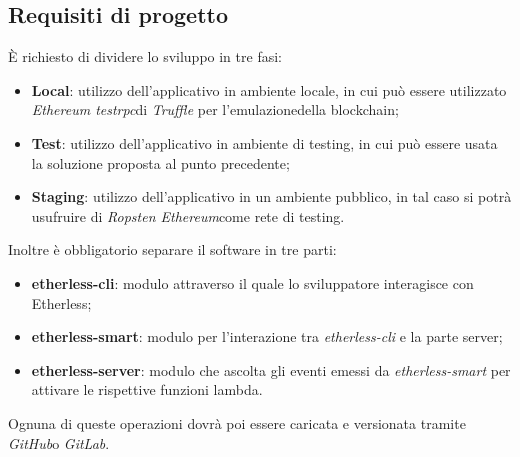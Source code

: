 \subsection{Requisiti di progetto}
È richiesto di dividere lo sviluppo in tre fasi:
\begin{itemize}
   	\item \textbf{Local}: utilizzo dell'applicativo in ambiente locale, in cui può essere utilizzato \textit{Ethereum testrpc}\glosp di \textit{Truffle} per
   	l'emulazione\glosp della blockchain\glo;
   	\item \textbf{Test}: utilizzo dell'applicativo in ambiente di testing, in cui può essere usata la soluzione proposta al punto precedente;
   	\item \textbf{Staging}: utilizzo dell'applicativo in un ambiente pubblico, in tal caso si potrà usufruire di \textit{Ropsten Ethereum}\glosp come rete di testing.
\end{itemize}
Inoltre è obbligatorio separare il software in tre parti:
\begin{itemize}
   	\item \textbf{etherless-cli}: modulo attraverso il quale lo sviluppatore interagisce con Etherless;
   	\item \textbf{etherless-smart}: modulo per l'interazione tra \textit{etherless-cli} e la parte server;
   	\item \textbf{etherless-server}: modulo che ascolta gli eventi emessi da \textit{etherless-smart} per attivare le rispettive funzioni lambda\glo. 
\end{itemize}
Ognuna di queste operazioni dovrà poi essere caricata e versionata tramite \textit{GitHub}\glosp o \textit{GitLab}\glo.
